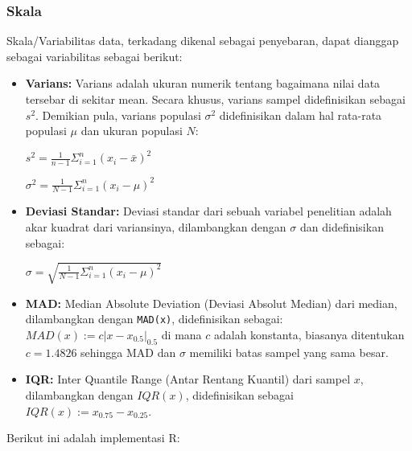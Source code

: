 \documentclass[
]{book}
\newenvironment{Shaded}{\begin{snugshade}}{\end{snugshade}}
\newcommand{\CommentTok}[1]{\textcolor[rgb]{0.56,0.35,0.01}{\textit{#1}}}
\newcommand{\KeywordTok}[1]{\textcolor[rgb]{0.13,0.29,0.53}{\textbf{#1}}}
\newcommand{\NormalTok}[1]{#1}
\newcommand{\OperatorTok}[1]{\textcolor[rgb]{0.81,0.36,0.00}{\textbf{#1}}}
\begin{document}
\hypertarget{skala}{%
\subsubsection*{Skala}\label{skala}}

Skala/Variabilitas data, terkadang dikenal sebagai penyebaran, dapat dianggap sebagai variabilitas sebagai berikut:

\begin{itemize}
\item
  \textbf{Varians:} Varians adalah ukuran numerik tentang bagaimana nilai data tersebar di sekitar mean. Secara khusus, varians sampel didefinisikan sebagai \(s^2\). Demikian pula, varians populasi \(\sigma^2\) didefinisikan dalam hal rata-rata populasi \(\mu\) dan ukuran populasi \(N\):

  \(s^2=\frac{1}{n-1}{\Sigma^n_{i=1}{(x_i-\bar{x})^2}}\)

  \(\sigma^2=\frac{1}{N-1}{\Sigma^n_{i=1}{(x_i-\mu)^2}}\)
\item
  \textbf{Deviasi Standar:} Deviasi standar dari sebuah variabel penelitian adalah akar kuadrat dari variansinya, dilambangkan dengan \(\sigma\) dan didefinisikan sebagai:

  \(\sigma=\sqrt{\frac{1}{N-1}{\Sigma^n_{i=1}{(x_i-\mu)^2}}}\)
\item
  \textbf{MAD:} Median Absolute Deviation (Deviasi Absolut Median) dari median, dilambangkan dengan \texttt{MAD(x)}, didefinisikan sebagai: \(MAD(x):=c|x-x_{0.5}|_{0.5}\) di mana \(c\) adalah konstanta, biasanya ditentukan \(c=1.4826\) sehingga MAD dan \(\sigma\) memiliki batas sampel yang sama besar.
\item
  \textbf{IQR:} Inter Quantile Range (Antar Rentang Kuantil) dari sampel \(x\), dilambangkan dengan \(IQR(x)\), didefinisikan sebagai \(IQR(x):=x_{0.75}-x_{0.25}\).
\end{itemize}

Berikut ini adalah implementasi R:

\begin{Shaded}
\end{Shaded}
\end{document}
